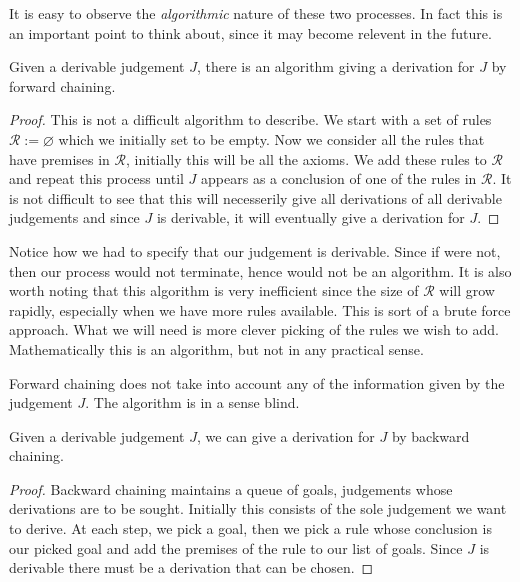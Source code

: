 It is easy to observe the \emph{algorithmic} nature of these two processes. In fact this is an important point to think about, since it may become relevent in the future.

\begin{lemma}
    Given a derivable judgement $J$, there is an algorithm giving a derivation for $J$ by forward chaining.
\end{lemma}

\begin{proof}
    This is not a difficult algorithm to describe. We start with a set of rules $\mathcal{R} := \varnothing $ which we initially set to be empty. Now we consider all the rules that have premises in $\mathcal{R}$, initially this will be all the axioms. We add these rules to $\mathcal{R}$ and repeat this process until $J$ appears as a conclusion of one of the rules in $\mathcal{R}$. It is not difficult to see that this will necesserily give all derivations of all derivable judgements and since $J$ is derivable, it will eventually give a derivation for $J$.
\end{proof}

\begin{remark}
    Notice how we had to specify that our judgement is derivable. Since if were not, then our process would not terminate, hence would not be an algorithm. It is also worth noting that this algorithm is very inefficient since the size of $\mathcal{R}$ will grow rapidly, especially when we have more rules available. This is sort of a brute force approach. What we will need is more clever picking of the rules we wish to add. Mathematically this is an algorithm, but not in any practical sense.
\end{remark}

Forward chaining does not take into account any of the information given by the judgement $J$. The algorithm is in a sense blind. 

\begin{lemma}
    Given a derivable judgement $J$, we can give a derivation for $J$ by backward chaining.
\end{lemma}

\begin{proof}
    Backward chaining maintains a queue of goals, judgements whose derivations are to be sought. Initially this consists of the sole judgement we want to derive. At each step, we pick a goal, then we pick a rule whose conclusion is our picked goal and add the premises of the rule to our list of goals. Since $J$ is derivable there must be a derivation that can be chosen.
\end{proof}

